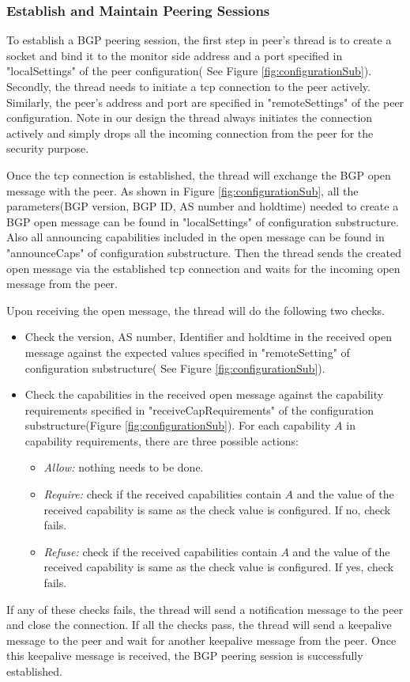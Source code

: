 \subsubsection{Establish and Maintain Peering Sessions}

To establish a BGP peering session, the first step in peer's thread is to create a socket and bind it to the monitor side address and a port specified in "localSettings" of the peer configuration( See Figure \ref{fig:configurationSub}). 
Secondly, the thread needs to initiate a tcp connection to the peer actively. Similarly, the peer's address and port are specified in "remoteSettings" of the peer configuration. Note in our design the thread always initiates the connection actively and simply drops all the incoming connection from the peer for the security purpose.

Once the tcp connection is established, the thread will exchange the BGP open message with the peer. As shown in  Figure \ref{fig:configurationSub}, all the parameters(BGP version, BGP ID, AS number and holdtime) needed to create a BGP open message can be found in "localSettings" of configuration substructure. Also all announcing capabilities included in the open message can be found in "announceCaps" of configuration substructure.
Then the thread sends the created open message via the established tcp connection and waits for the incoming open message from the peer. 

Upon receiving the open message, the thread will do the following two checks.
\begin{itemize}
\item{ Check the version, AS number, Identifier and holdtime in the received open message against the expected values specified in "remoteSetting" of configuration substructure( See Figure \ref{fig:configurationSub}). }
\item{ Check the capabilities in the received open message against the capability requirements specified in "receiveCapRequirements" of the configuration substructure(Figure \ref{fig:configurationSub}). For each capability $A$ in capability requirements, there are three possible actions:  }
\begin{itemize}
\item{ \emph{Allow:} nothing needs to be done.}
\item{ \emph{Require:} check if the received capabilities contain $A$ and the value of the received capability is same as the check value is configured. If no, check fails.}
\item{ \emph{Refuse:} check if the received capabilities contain $A$ and the value of the received capability is same as the check value is configured. If yes, check fails. }
\end{itemize}
\end{itemize}
If any of these checks fails, the thread will send a notification message to the peer and close the connection.
If all the checks pass, the thread will send a keepalive message to the peer and wait for another keepalive message from the peer. Once this keepalive message is received, the BGP peering session is successfully established. 

